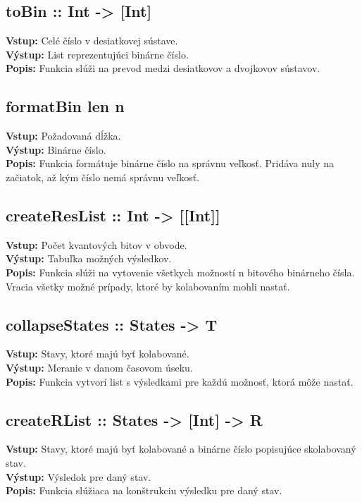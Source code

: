 \subsection*{toBin :: Int -> [Int]}
\textbf{Vstup:} Celé číslo v desiatkovej sústave.\\
\textbf{Výstup:} List reprezentujúci binárne číslo.\\
\textbf{Popis:} Funkcia slúži na prevod medzi desiatkovov a dvojkovov 
sústavov.

\subsection*{formatBin len n}
\textbf{Vstup:} Požadovaná dĺžka. \\
\textbf{Výstup:} Binárne číslo.\\
\textbf{Popis:} Funkcia formátuje binárne číslo na správnu veľkosť. Pridáva
nuly na začiatok, až kým číslo nemá správnu veľkosť.

\subsection*{createResList :: Int -> [[Int]]}
\textbf{Vstup:} Počet kvantových bitov v obvode.\\
\textbf{Výstup:} Tabuľka možných výsledkov.\\
\textbf{Popis:} Funkcia slúži na vytovenie všetkych možností n bitového 
binárneho čísla. Vracia všetky možné prípady, ktoré by kolabovaním mohli
nastať.

\subsection*{collapseStates :: States -> T}
\textbf{Vstup:} Stavy, ktoré majú byť kolabované.\\
\textbf{Výstup:} Meranie v danom časovom úseku.\\
\textbf{Popis:} Funkcia vytvorí list s výsledkami pre každú možnosť, ktorá
môže nastať.

\subsection*{createRList :: States -> [Int] -> R}
\textbf{Vstup:} Stavy, ktoré majú byť kolabované a binárne číslo popisujúce
skolabovaný stav.\\
\textbf{Výstup:} Výsledok pre daný stav.\\
\textbf{Popis:} Funkcia slúžiaca na konštrukciu výsledku pre daný stav.

